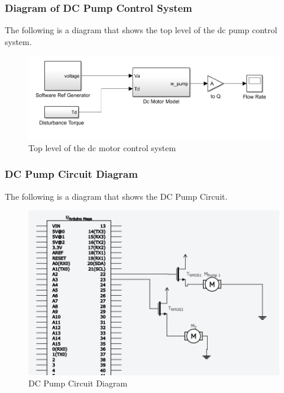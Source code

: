\documentclass [10pt]{article}
\begin{document}
\subsubsection{Diagram of DC Pump Control System}
The following is a diagram that shows the top level of the dc pump control system. 
\begin{figure} [h!]
	\centering
	\includegraphics [scale = 0.6] {Figures/DC_PumpSim.png}
	\caption{Top level of the dc motor control system}
\end{figure}

\subsubsection{DC Pump Circuit Diagram}
The following is a diagram that shows the DC Pump Circuit.
\begin{figure} [h!]
	\centering
	\includegraphics [scale = 0.6] {Figures/Pump.png}
	\caption{DC Pump Circuit Diagram}
\end{figure}
\end{document}
